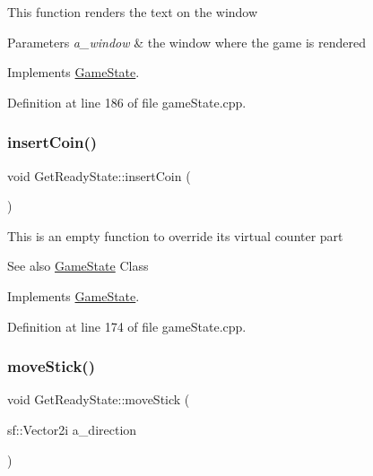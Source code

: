 This function renders the text on the window


\begin{DoxyParams}{Parameters}
{\em a\+\_\+window} & the window where the game is rendered \\
\hline
\end{DoxyParams}


Implements \hyperlink{class_game_state_a5ffd5ce9acb7499ddef613e8836d1ef8}{Game\+State}.



Definition at line 186 of file game\+State.\+cpp.

\mbox{\label{class_get_ready_state_afac1da927d38cf32960f2370856ec9f6}} 
\subsubsection{\texorpdfstring{insert\+Coin()}{insertCoin()}}
{\footnotesize\ttfamily void Get\+Ready\+State\+::insert\+Coin (\begin{DoxyParamCaption}{ }\end{DoxyParamCaption})\hspace{0.3cm}{\ttfamily [virtual]}}

This is an empty function to override it\textquotesingle{}s virtual counter part \begin{DoxySeeAlso}{See also}
\hyperlink{class_game_state}{Game\+State} Class 
\end{DoxySeeAlso}


Implements \hyperlink{class_game_state_a4cd6f5b4ad23fc08dca287df26d94b94}{Game\+State}.



Definition at line 174 of file game\+State.\+cpp.

\mbox{\label{class_get_ready_state_a0a7f1548b4c58e8bd5634ceb59ba7b9b}} 
\subsubsection{\texorpdfstring{move\+Stick()}{moveStick()}}
{\footnotesize\ttfamily void Get\+Ready\+State\+::move\+Stick (\begin{DoxyParamCaption}\item[{sf\+::\+Vector2i}]{a\+\_\+direction }\end{DoxyParamCaption})\hspace{0.3cm}{\ttfamily [virtual]}}

